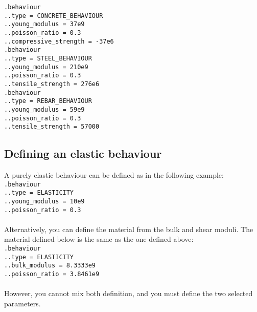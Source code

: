 \documentclass[10pt]{article}
\begin{document}
\noindent \verb+.behaviour+\\
\verb+..type = CONCRETE_BEHAVIOUR+\\
\verb+..young_modulus = 37e9+\\
\verb+..poisson_ratio = 0.3+\\
\verb+..compressive_strength = -37e6+\\

\noindent \verb+.behaviour+\\
\verb+..type = STEEL_BEHAVIOUR+\\
\verb+..young_modulus = 210e9+\\
\verb+..poisson_ratio = 0.3+\\
\verb+..tensile_strength = 276e6+\\

\noindent \verb+.behaviour+\\
\verb+..type = REBAR_BEHAVIOUR+\\
\verb+..young_modulus = 59e9+\\
\verb+..poisson_ratio = 0.3+\\
\verb+..tensile_strength = 57000+

\subsection{Defining an elastic behaviour}

A purely elastic behaviour can be defined as in the following example:\\

\noindent \verb+.behaviour+\\
\verb+..type = ELASTICITY+\\
\verb+..young_modulus = 10e9+\\
\verb+..poisson_ratio = 0.3+

\paragraph{} Alternatively, you can define the material from the bulk and shear moduli. The material defined below is the same as the one defined above:\\

\noindent \verb+.behaviour+\\
\verb+..type = ELASTICITY+\\
\verb+..bulk_modulus = 8.3333e9+\\
\verb+..poisson_ratio = 3.8461e9+

\paragraph{} However, you cannot mix both definition, and you must define the two selected parameters.
\end{document}
